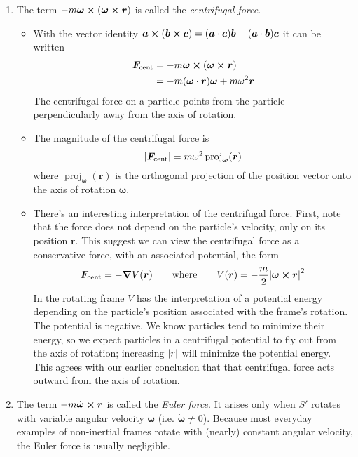 \documentclass[11pt, a4paper]{article}
\newcommand{\eqtext}[1]{\qquad \text{#1} \qquad}
\newcommand{\bdot}[1]{\dot{\bm{#1}}} %
\begin{document}
\begin{enumerate}
	
	\item The term $ -m \bm{\omega} \cross (\bm{\omega} \cross \bm{r}) $ is called the \textit{centrifugal force}. 
	\begin{itemize}
		\item With the vector identity $ \bm{a} \cross (\bm{b} \cross \bm{c}) = (\bm{a} \cdot \bm{c})\bm{b} - (\bm{a} \cdot \bm{b})\bm{c} $ it can be written
		\begin{align*}
			\bm{F}_{\text{cent}} &= -m \bm{\omega} \cross (\bm{\omega} \cross \bm{r})\\
			&=- m(\bm{\omega} \cdot \bm{r}) \bm{\omega} + m \omega^{2} \bm{r}
		\end{align*}
		The centrifugal force on a particle points from the particle perpendicularly away from the axis of rotation. 
			
		\item The magnitude of the centrifugal force is
		\begin{equation*}
			\abs{\bm{F}_{\text{cent}}} = m \omega^{2} \operatorname{proj}_{\bm{\omega}}(\bm{r})
		\end{equation*}
		where $ \operatorname{proj}_{\bm{\omega}}(\bm{r}) $ is the orthogonal projection of the position vector onto the axis of rotation $ \bm{\omega} $.
		
		\item There's an interesting interpretation of the centrifugal force. First, note that the force does not depend on the particle's velocity, only on its position $ \bm{r} $. This suggest we can view the centrifugal force as a conservative force, with an associated potential, the form
		\begin{equation*}
			\bm{F}_{\text{cent}} = - \grad V(\bm{r}) \eqtext{where} V(\bm{r}) = -\frac{m}{2}\abs{\bm{\omega} \cross \bm{r}}^{2}
		\end{equation*}
		In the rotating frame $ V $ has the interpretation of a potential energy depending on the particle's position associated with the frame's rotation. The potential is negative. We know particles tend to minimize their energy, so we expect particles in a centrifugal potential to fly out from the axis of rotation; increasing $ \abs{r} $ will minimize the potential energy. This agrees with our earlier conclusion that that centrifugal force acts outward from the axis of rotation.
			
	\end{itemize}
	
	
	\item The term $ - m \bdot{\omega} \cross \bm{r} $ is called the \textit{Euler force}. It arises only when $ S' $ rotates with variable angular velocity $ \bm{\omega} $ (i.e. $ \bdot{\omega} \neq 0 $). Because most everyday examples of non-inertial frames rotate with (nearly) constant angular velocity, the Euler force is usually negligible.
	
\end{enumerate}
\end{document}
